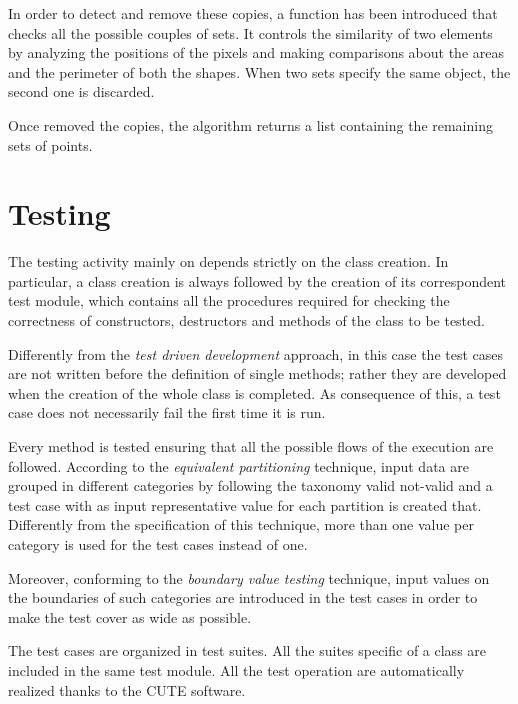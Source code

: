 		

		In order to detect and remove these copies, a function has been introduced that checks all the possible couples of sets. 
		It controls the similarity of two elements by analyzing the positions of the pixels and making comparisons about the areas and the perimeter of both the shapes. 
		When two sets specify the same object, the second one is discarded. 
		
		Once removed the copies, the algorithm returns a list containing the remaining sets of points.

	

	\section{Testing}
	The testing activity mainly on depends strictly on the class creation.
	In particular, a class creation is always followed by the creation of its correspondent test module, which contains all the procedures required for checking the correctness of constructors, destructors and methods of the class to be tested.
	
	Differently from the \emph{test driven development} approach, in this case the test cases are not written before the definition of single methods; rather they are developed when the creation of the whole class is completed.
	As consequence of this, a test case does not necessarily fail the first time it is run. 
	
	Every method is tested ensuring that all the possible flows of the execution are followed.
	According to the \emph{equivalent partitioning} technique, input data are grouped in different categories by following the taxonomy valid not-valid and a test case with as input representative value for each partition is created that. 
	Differently from the specification of this technique, more than one value per category is used for the test cases instead of one.

	Moreover, conforming to the \emph{boundary value testing} technique, input values on the boundaries of such categories are introduced in the test cases in order to make the test cover as wide as possible. 

	The test cases are organized in test suites. All the suites specific of a class are included in the same test module. All the test operation are automatically realized thanks to the CUTE software.





